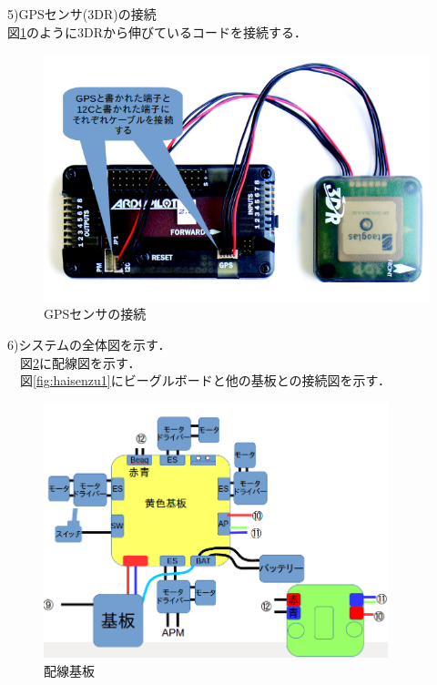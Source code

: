 \documentclass[12pt,oneside]{sotsuken_paper}
\begin{document}
5)GPSセンサ(3DR)の接続\\
 図\ref{fig:setuzoku10}のように3DRから伸びているコードを接続する．

\begin{figure}[H]
\begin{center}
\includegraphics[width=140mm]{img/setuzoku10.png}
\end{center}
\caption{GPSセンサの接続}
\label{fig:setuzoku10}
\end{figure}

6)システムの全体図を示す．\\
　図\ref{fig:haisenzu2}に配線図を示す．\\
　図\ref{fig:haisenzu1}にビーグルボードと他の基板との接続図を示す．\\

\begin{figure}[H]
\begin{center}
\includegraphics[width=100mm]{img/haisenzu2.png}
\end{center}
\caption{配線基板}
\label{fig:haisenzu2}
\end{figure}
\end{document}
